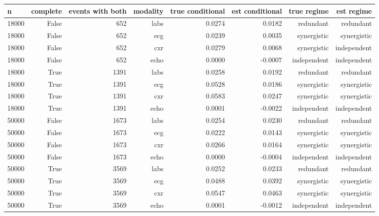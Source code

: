 \begin{tabular}{lrrrrrrr}
\toprule
\textbf{n} & \textbf{complete} & \textbf{events with both} & \textbf{modality} & \textbf{true conditional} & \textbf{est conditional} & \textbf{true regime} & \textbf{est regime} \\
\midrule
18000 & False & 652 & labs & 0.0274 & 0.0182 & redundant & redundant \\
18000 & False & 652 & ecg & 0.0239 & 0.0035 & synergistic & synergistic \\
18000 & False & 652 & cxr & 0.0279 & 0.0068 & synergistic & independent \\
18000 & False & 652 & echo & 0.0000 & -0.0007 & independent & independent \\
18000 & True & 1391 & labs & 0.0258 & 0.0192 & redundant & redundant \\
18000 & True & 1391 & ecg & 0.0528 & 0.0186 & synergistic & synergistic \\
18000 & True & 1391 & cxr & 0.0583 & 0.0247 & synergistic & synergistic \\
18000 & True & 1391 & echo & 0.0001 & -0.0022 & independent & independent \\
50000 & False & 1673 & labs & 0.0254 & 0.0230 & redundant & redundant \\
50000 & False & 1673 & ecg & 0.0222 & 0.0143 & synergistic & synergistic \\
50000 & False & 1673 & cxr & 0.0266 & 0.0164 & synergistic & synergistic \\
50000 & False & 1673 & echo & 0.0000 & -0.0004 & independent & independent \\
50000 & True & 3569 & labs & 0.0252 & 0.0233 & redundant & redundant \\
50000 & True & 3569 & ecg & 0.0488 & 0.0392 & synergistic & synergistic \\
50000 & True & 3569 & cxr & 0.0547 & 0.0463 & synergistic & synergistic \\
50000 & True & 3569 & echo & 0.0001 & -0.0012 & independent & independent \\
\bottomrule
\end{tabular}
